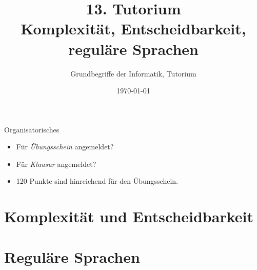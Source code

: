 




\title[Komplexität, Entscheidbarkeit, reguläre Sprachen]{13. Tutorium\\ Komplexität, Entscheidbarkeit, reguläre Sprachen}
\subtitle{Grundbegriffe der Informatik, Tutorium \hashtag \mytutnumber}
\date{\today}


\usetikzlibrary{matrix}
\usetikzlibrary{arrows.meta}
\usetikzlibrary{automata}
\usetikzlibrary{tikzmark}


\titleframe
\begin{frame}{Organisatorisches}
	\begin{itemize}
		\item Für \emph{Übungsschein} angemeldet?
		\item Für \emph{Klausur} angemeldet?
		\item 120 Punkte sind hinreichend für den Übungsschein.
	\end{itemize}
\end{frame}

\roadmap



\section{Komplexität und Entscheidbarkeit}




\section{Reguläre Sprachen}




